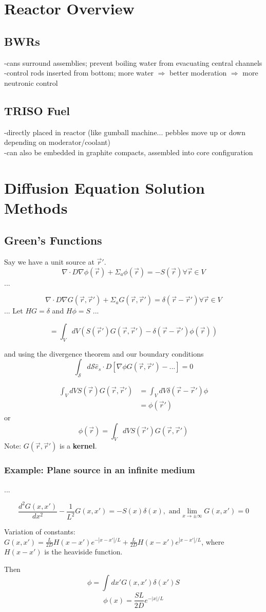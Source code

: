 \documentclass{report}
\newcommand{\h}[1]{\section*{#1}}
\newcommand{\hh}[1]{\subsection*{#1}}
\newcommand{\hhh}[1]{\subsubsection*{#1}}
\newcommand{\Xs}{\Sigma}
\newcommand{\pos}{\vec{r}}
\newcommand{\greens}{G(\pos,\pos')}
\newcommand{\oneDgreens}{G(x,x')}
\begin{document}
\h{Reactor Overview}

\hh{BWRs}

-cans surround assemblies; prevent boiling water from evacuating central channels\\
-control rods inserted from bottom; more water $\Rightarrow$ better moderation $\Rightarrow$ more neutronic control \\

\hh{TRISO Fuel}

-directly placed in reactor (like gumball machine... pebbles move up or down depending on moderator/coolant) \\
-can also be embedded in graphite compacts, assembled into core configuration



\h{Diffusion Equation Solution Methods}

\hh{Green's Functions}

Say we have a unit source at $\pos'$. 
$$ \nabla \cdot D \nabla \phi(\pos) +\Xs_a \phi(\pos) = -S(\pos) \forall \pos \in V$$
...

$$ \nabla \cdot D \nabla \greens + \Xs_a \greens = \delta(\pos-\pos') \forall \pos \in V $$
...
Let $HG = \delta$ and $H\phi = S$
...

$$ = \int_V dV \left( S(\pos') \greens - \delta(\pos-\pos')\phi(\pos)\right)$$

and using the divergence theorem and our boundary conditions
$$ \int_{\mathcal{S}} d\mathcal{S} \hat{e}_s \cdot D \left[ \nabla \phi \greens - ... \right] = 0 $$

\begin{align*}
\int_V dV S(\pos)\greens	&= \int_V dV \delta(\pos-\pos')\phi \\
							&= \phi(\pos') 
\end{align*}
or 
$$ \phi(\pos) = \int_V dV S(\pos')\greens $$
Note: $\greens$ is a \textbf{kernel}.

\hhh{Example: Plane source in an infinite medium}

...

$$\frac{d^2 \oneDgreens}{dx^2} - \frac{1}{L^2} \oneDgreens = -S(x)\delta(x), \text{ and} \lim_{x\rightarrow\pm\infty} \oneDgreens = 0$$

Variation of constants: $\oneDgreens = \frac{L}{2D}H(x-x')e^{-|x-x'|/L} + \frac{L}{2D}H(x-x')e^{|x-x'|/L}$, where $H(x-x')$ is the heaviside function.

Then 
$$ \phi = \int_{}^{}dx' \oneDgreens \delta(x') S $$
$$ \phi(x) = \frac{SL}{2D}e^{-|x|/L} $$
\end{document}
